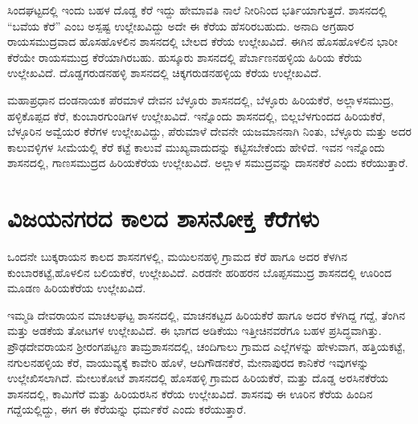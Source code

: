 ಸಿಂದಘಟ್ಟದಲ್ಲಿ ಇಂದು ಬಹಳ ದೊಡ್ಡ ಕೆರೆ ಇದ್ದು ಹೇಮಾವತಿ ನಾಲೆ ನೀರಿನಿಂದ ಭರ್ತಿಯಾಗುತ್ತದೆ. ಶಾಸನದಲ್ಲಿ “ಬವೆಯ ಕೆರೆ” ಎಂಬ ಅಸ್ಪಷ್ಟ ಉಲ್ಲೇಖವಿದ್ದು ಅದೇ ಈ ಕೆರೆಯ ಹೆಸರಿರಬಹುದು. ಅನಾದಿ ಅಗ್ರಹಾರ ರಾಯಸಮುದ್ರವಾದ ಹೊಸಹೊಳಲಿನ ಶಾಸನದಲ್ಲಿ ಬೇಲದ ಕೆರೆಯ ಉಲ್ಲೇಖವಿದೆ. ಈಗಿನ ಹೊಸಹೊಳಲಿನ ಭಾರೀ ಕೆರೆಯೇ ರಾಯಸಮುದ್ರ ಕೆರೆಯಾಗಿರಬಹು. ಹುಸ್ಕೂರು ಶಾಸನದಲ್ಲಿ ಪೆರ್ಬಾಣನಹಳ್ಳಿಯ ಹಿರಿಯ ಕೆರೆಯ ಉಲ್ಲೇಖವಿದೆ. ದೊಡ್ಡಗರುಡನಹಳ್ಳಿ ಶಾಸನದಲ್ಲಿ ಚಿಕ್ಕಗರುಡನಹಳ್ಳಿಯ ಕೆರೆಯ ಉಲ್ಲೇಖವಿದೆ.

ಮಹಾಪ್ರಧಾನ ದಂಡನಾಯಕ ಪೆರಮಾಳೆ ದೇವನ ಬೆಳ್ಳೂರು ಶಾಸನದಲ್ಲಿ, ಬೆಳ್ಳೂರು ಹಿರಿಯಕೆರೆ, ಅಲ್ಲಾಳಸಮುದ್ರ, ಹಳ್ಳಿಕೊಪ್ಪದ ಕೆರೆ, ಕುಂಬಾರಗುಂಡಿಗಳ ಉಲ್ಲೇಖವಿದೆ. ಇನ್ನೊಂದು ಶಾಸನದಲ್ಲಿ, ಬಿಲ್ಲಬೆಳಗುಂದದ ಹಿರಿಯಕೆರೆ, ಬೆಳ್ಳೂರಿನ ಅವ್ವೆಯರ ಕೆರೆಗಳ ಉಲ್ಲೇಖವಿದ್ದು, ಪೆರುಮಾಳೆ ದೇವನೇ ಯಜಮಾನನಾಗಿ ನಿಂತು, ಬೆಳ್ಳೂರು ಮತ್ತು ಅದರ ಕಾಲುವಳ್ಳಿಗಳ ಸೀಮೆಯಲ್ಲಿ ಕೆರೆ ಕಟ್ಟೆ ಕಾಲುವೆ ಮುಖ್ಯವಾದುದನ್ನು ಕಟ್ಟಿಸಬೇಕೆಂದು ಹೇಳಿದೆ. ಇವನ ಇನ್ನೊಂದು ಶಾಸನದಲ್ಲಿ, ಗಾಣಸಮುದ್ರದ ಹಿರಿಯಕೆರೆಯ ಉಲ್ಲೇಖವಿದೆ. ಅಲ್ಲಾಳ ಸಮುದ್ರವನ್ನು ದಾಸನಕೆರೆ ಎಂದು ಕರೆಯುತ್ತಾರೆ.

\section*{ವಿಜಯನಗರದ ಕಾಲದ ಶಾಸನೋಕ್ತ ಕೆರೆಗಳು}

ಒಂದನೇ ಬುಕ್ಕರಾಯನ ಕಾಲದ ಶಾಸನಗಳಲ್ಲಿ, ಮಯಿಲನಹಳ್ಳಿ ಗ್ರಾಮದ ಕೆರೆ ಹಾಗೂ ಅದರ ಕೆಳಗಿನ ಕುಂಬಾರಕಟ್ಟೆ,\break ಹೊಳಲಿನ ಬಲಿಯಕೆರೆ, ಉಲ್ಲೇಖವಿದೆ. ಎರಡನೇ ಹರಿಹರನ ಬೊಪ್ಪಸಮುದ್ರ ಶಾಸನದಲ್ಲಿ ಊರಿಂದ ಮೂಡಣ ಹಿರಿಯಕೆರೆಯ ಉಲ್ಲೇಖವಿದೆ.

ಇಮ್ಮಡಿ ದೇವರಾಯನ ಮಾಚಲಘಟ್ಟ ಶಾಸನದಲ್ಲಿ, ಮಾಚನಕಟ್ಟದ ಹಿರಿಯಕೆರೆ ಹಾಗೂ ಅದರ ಕೆಳಗಿದ್ದ ಗದ್ದೆ, ತೆಂಗಿನ ಮತ್ತು ಅಡಕೆಯ ತೋಟಗಳ ಉಲ್ಲೇಖವಿದೆ. ಈ ಭಾಗದ ಅಡಿಕೆಯು ಇತ್ತೀಚಿನವರೆಗೂ ಬಹಳ ಪ್ರಸಿದ್ಧವಾಗಿತ್ತು. ಪ್ರೌಢದೇವರಾಯನ ಶ‍್ರೀರಂಗಪಟ್ಟಣ ತಾಮ್ರಶಾಸನದಲ್ಲಿ, ಚಂದಿಗಾಲು ಗ್ರಾಮದ ಎಲ್ಲೆಗಳನ್ನು ಹೇಳುವಾಗ, ಹತ್ತಿಯಕಟ್ಟೆ, ನಗುಲನಹಳ್ಳಿಯ ಕೆರೆ, ವಾಯುವ್ಯಕ್ಕೆ ಕಾವೇರಿ ಹೊಳೆ, ಆದಿಗೌಡನಕೆರೆ, ಮೇನಾಪುರದ ಕಾನಿಕೆರೆ ಇವುಗಳನ್ನು ಉಲ್ಲೇಖಿಸಲಾಗಿದೆ. ಮೇಲುಕೋಟೆ ಶಾಸನದಲ್ಲಿ ಹೊಸಹಳ್ಳಿ ಗ್ರಾಮದ ಹಿರಿಯಕೆರೆ, ಮತ್ತು ದೊಡ್ಡ ಅರಸಿನಕೆರೆಯ ಶಾಸನದಲ್ಲಿ, ಕಾಮಿಗೆರೆ ಮತ್ತು ಹಿರಿಯರಸಿನ ಕೆರೆಯ ಉಲ್ಲೇಖವಿದೆ. ಶಾಸನವು ಈ ಊರಿನ ಕೆರೆಯ ಹಿಂದಿನ ಗದ್ದೆಯಲ್ಲಿದ್ದು, ಈಗ ಈ ಕೆರೆಯನ್ನು ಧರ್ಮಕೆರೆ ಎಂದು ಕರೆಯುತ್ತಾರೆ.

